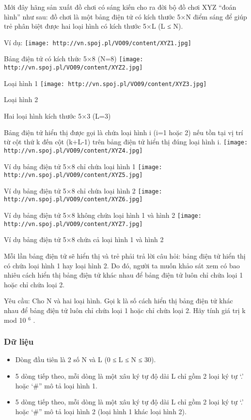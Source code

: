 



   Mới đây hãng sản xuất đồ chơi có sáng kiến cho ra đời bộ đồ chơi XYZ “đoán hình” như sau: đồ chơi là một bảng điện tử có kích thước 5×N điểm sáng để giúp trẻ phân biệt được hai loại hình có kích thước 5×L (L ≤ N).  

   Ví dụ:  
\texttt{[image: http://vn.spoj.pl/VO09/content/XYZ1.jpg]}

               Bảng điện tử có kích thức 5×8 (N=8)             
\texttt{[image: http://vn.spoj.pl/VO09/content/XYZ2.jpg]}

                       Loại hình 1                     
\texttt{[image: http://vn.spoj.pl/VO09/content/XYZ3.jpg]}

                       Loại hình 2                     

                       Hai loại hình kích thước 5×3 (L=3)                     

   Bảng điện tử hiển thị được gọi là chứa loại hình i (i=1 hoặc 2) nếu tồn tại vị trí từ cột thứ k đến cột (k+L-1) trên bảng điện tử hiển thị đúng loại hình i.  
\texttt{[image: http://vn.spoj.pl/VO09/content/XYZ4.jpg]}

               Ví dụ bảng điện tử 5×8 chỉ chứa loại hình 1             
\texttt{[image: http://vn.spoj.pl/VO09/content/XYZ5.jpg]}

               Ví dụ bảng điện tử 5×8 chỉ chứa loại hình 2             
\texttt{[image: http://vn.spoj.pl/VO09/content/XYZ6.jpg]}

               Ví dụ bảng điện tử 5×8  không chứa loại hình 1 và hình 2             
\texttt{[image: http://vn.spoj.pl/VO09/content/XYZ7.jpg]}

               Ví dụ bảng điện tử 5×8  chứa cả loại hình 1 và hình 2             

   Mỗi lần bảng điện tử sẽ hiển thị và trẻ phải trả lời câu hỏi: bảng điện tử hiển thị có chứa loại hình 1 hay loại hình 2. Do đó, người ta muốn khảo sát xem có bao nhiêu cách hiển thị bảng điện tử khác nhau để bảng điện tử luôn chỉ chứa loại 1 hoặc chỉ chứa loại 2.  

   Yêu cầu: Cho N và hai loại hình. Gọi k là số cách hiển thị bảng điện tử khác nhau để bảng điện tử luôn chỉ chứa loại 1 hoặc chỉ chứa loại 2. Hãy tính giá trị k  mod 10   $^    6   $   .  

\subsubsection{   Dữ liệu  }
\begin{itemize}
	\item     Dòng đầu tiên là 2 số N và L (0 ≤ L ≤ N ≤ 30).   
	\item     5 dòng tiếp theo, mỗi dòng là một xâu ký tự độ dài L chỉ gồm 2 loại ký tự ‘.’ hoặc ‘\#” mô tả loại hình 1.   
	\item     5 dòng tiếp theo, mỗi dòng là một xâu ký tự độ dài L chỉ gồm 2 loại ký tự ‘.’ hoặc ‘\#” mô tả loại hình 2 (loại hình 1 khác loại hình 2).   
\end{itemize}

